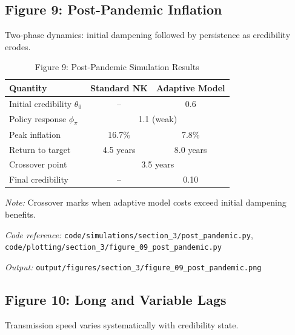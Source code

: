 \documentclass[11pt]{article}
\begin{document}
\subsection{Figure 9: Post-Pandemic Inflation}

Two-phase dynamics: initial dampening followed by persistence as credibility erodes.

\begin{table}[htbp]
\centering
\caption{Figure 9: Post-Pandemic Simulation Results}
\label{tab:post_pandemic}
\begin{threeparttable}
\begin{tabular}{lcc}
\toprule
Quantity & Standard NK & Adaptive Model \\
\midrule
Initial credibility $\theta_0$ & -- & 0.6 \\
Policy response $\phi_\pi$ & \multicolumn{2}{c}{1.1 (weak)} \\
\midrule
Peak inflation & 16.7\% & 7.8\% \\
Return to target & 4.5 years & 8.0 years \\
Crossover point & \multicolumn{2}{c}{3.5 years} \\
Final credibility & -- & 0.10 \\
\bottomrule
\end{tabular}
\begin{tablenotes}
\small
\item \textit{Note:} Crossover marks when adaptive model costs exceed initial dampening benefits.
\item \textit{Code reference:} \texttt{code/simulations/section\_3/post\_pandemic.py}, \texttt{code/plotting/section\_3/figure\_09\_post\_pandemic.py}
\item \textit{Output:} \texttt{output/figures/section\_3/figure\_09\_post\_pandemic.png}
\end{tablenotes}
\end{threeparttable}
\end{table}

\subsection{Figure 10: Long and Variable Lags}

Transmission speed varies systematically with credibility state.
\end{document}
